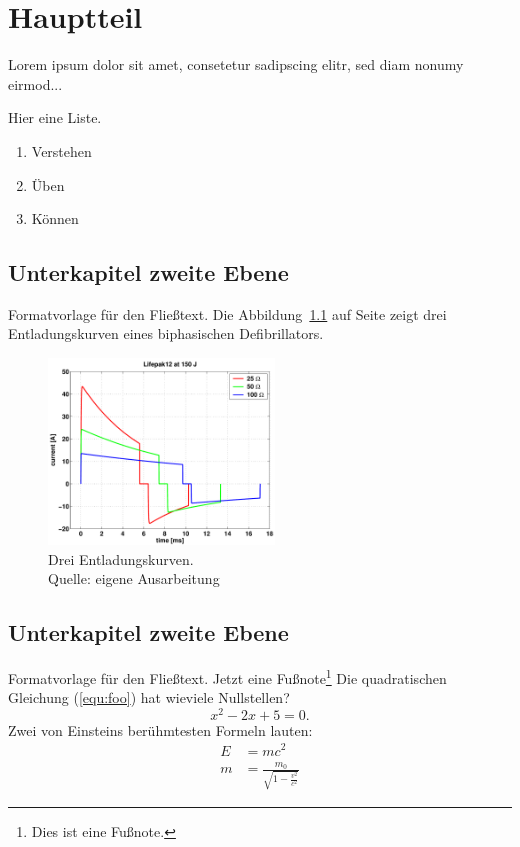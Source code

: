 \chapter{Hauptteil}
Lorem ipsum dolor sit amet, consetetur sadipscing elitr, sed diam nonumy
eirmod...

Hier eine Liste.
\begin{enumerate}
 \item Verstehen
 \item Üben
 \item Können
\end{enumerate}


\section{Unterkapitel zweite Ebene}
Formatvorlage für den Fließtext. Die Abbildung~\ref{fig:ex} auf Seite \pageref{fig:ex} zeigt drei Entladungskurven eines biphasischen Defibrillators.
\begin{figure}[htb]
  \centering
  \includegraphics[width=6cm]{content/image/defi}
  \caption[Entladungskurven eines biphasischen Defibrillators]{Drei Entladungskurven. \\Quelle: eigene Ausarbeitung}
 \label{fig:ex}
\end{figure}


\section{Unterkapitel zweite Ebene}
Formatvorlage für den Fließtext.
Jetzt eine Fußnote\footnote{Dies ist eine Fußnote.}
Die quadratischen Gleichung (\ref{equ:foo}) hat wieviele Nullstellen?
\begin{equation}
 \label{equ:foo}
 x^2-2x+5=0.
\end{equation}
Zwei von Einsteins berühmtesten Formeln lauten:
\begin{eqnarray*}
  E &= mc^2                                  \\
  m &= \frac{m_0}{\sqrt{1-\frac{v^2}{c^2}}}
\end{eqnarray*}


